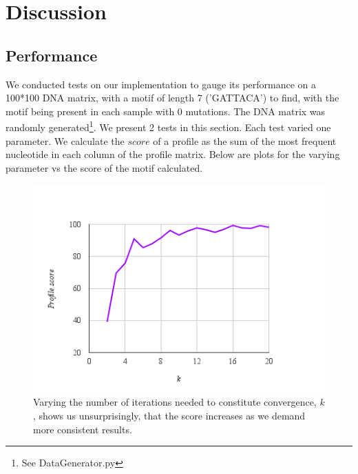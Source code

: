 \documentclass{bioinfo}
\begin{document}
\section{Discussion}
\subsection{Performance}
We conducted tests on our implementation to gauge its performance on a 100*100 DNA matrix, with a motif of length 7 ('GATTACA') to find, with the motif being present in each sample with 0 mutations. The DNA matrix was randomly generated\footnote{See DataGenerator.py}. We present 2 tests in this section. Each test varied one parameter. We calculate the $score$ of a profile as the sum of the most frequent nucleotide in each column of the profile matrix. Below are plots for the varying parameter vs the score of the motif calculated.


\begin{figure}[h]%
    \centerline{\includegraphics[scale=0.5]{k_score.png}}
\caption{Varying the number of iterations needed to constitute convergence, $k$, shows us unsurprisingly, that the score increases as we demand more consistent results.}\label{fig:01}
\end{figure}
\end{document}
